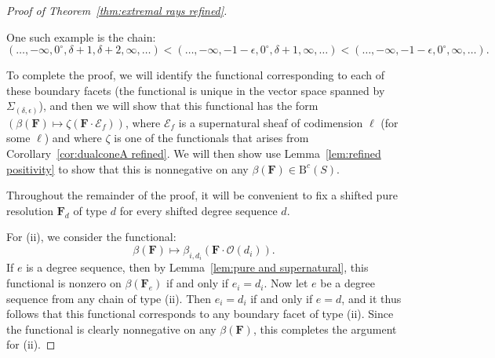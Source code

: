 \documentclass[12pt]{amsart}
\theoremstyle{definition}
\theoremstyle{remark}
\newcommand{\cc}{c}
\newcommand{\dd}{d}
\newcommand{\cO}{\mathcal{O}}
\newcommand{\cE}{\mathcal{E}}
\newcommand{\FF}{\mathbf{F}}
\newcommand{\zp}{\circ}
\newcommand{\BBQ}{\mathrm{B}}
\begin{document}
\begin{proof}[Proof of Theorem~\ref{thm:extremal rays refined}]
\begin{enumerate}[(i)]
%
One such example is the chain:
\[
(\dots,-\infty,0^\zp,\delta+1,\delta+2,\infty,\dots)<(\dots,-\infty,-1-\epsilon,0^\zp,\delta+1,\infty,\dots)<(\dots,-\infty,-1-\epsilon,0^\zp,\infty,\dots).
\]
\end{enumerate} 

To complete the proof, we will identify the functional corresponding to each of these boundary facets (the functional is unique in the vector space spanned by $\Sigma_{(\delta,\epsilon)}$), and then we will show that this functional has the form $(\beta(\FF)\mapsto \zeta(\FF\cdot \cE_f))$, where $\cE_f$ is a supernatural sheaf of codimension $\ell$ (for some $\ell$) and where $\zeta$ is one of the functionals that arises from Corollary~\ref{cor:dualconeA refined}.   We will then show use Lemma~\ref{lem:refined positivity} to show that this is nonnegative on any $\beta(\FF)\in \BBQ^{\cc}(S)$.


Throughout the remainder of the proof, it will be convenient to fix a shifted pure resolution $\FF_{\dd}$ of type $\dd$ for every shifted degree sequence $\dd$.


For (ii), we consider the functional:
\[
\beta(\FF)\mapsto \beta_{i,{d_i}}(\FF\cdot \cO(d_i)).
\]
If $e$ is a degree sequence, then by Lemma~\ref{lem:pure and supernatural}, this functional is nonzero on $\beta(\FF_e)$ if and only if $e_i=d_i$.
Now let $e$ be a degree sequence from any chain of type (ii).  Then $e_i=d_i$ if and only if $e=d$, and it thus follows that this functional corresponds to any boundary facet of type (ii).  Since the functional is clearly nonnegative on any $\beta(\FF)$, this completes the argument for (ii).


\end{proof}
\end{document}
